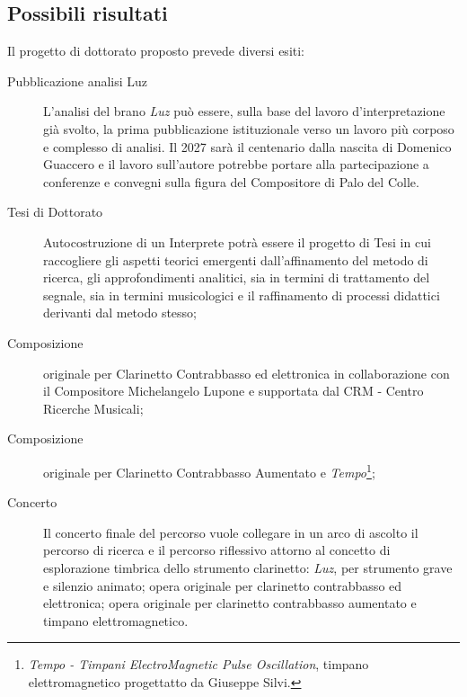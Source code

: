 \documentclass{gs-adonis}
\begin{document}
\subsection{Possibili risultati}%


Il progetto di dottorato proposto prevede diversi esiti:

\begin{description}
  \item[Pubblicazione analisi Luz] L'analisi del brano \emph{Luz} può essere,
    sulla base del lavoro d'interpretazione già svolto, la prima pubblicazione
    istituzionale verso un lavoro più corposo e complesso di analisi. Il 2027
    sarà il centenario dalla nascita di Domenico Guaccero e il lavoro
    sull'autore potrebbe portare alla partecipazione a conferenze e convegni
    sulla figura del Compositore di Palo del Colle.
  \item[Tesi di Dottorato] Autocostruzione di un Interprete potrà essere il
    progetto di Tesi in cui raccogliere gli aspetti teorici emergenti
    dall'affinamento del metodo di ricerca, gli approfondimenti analitici, sia
    in termini di trattamento del segnale, sia in termini musicologici e il
    raffinamento di processi didattici derivanti dal metodo stesso;
  \item[Composizione] originale per Clarinetto Contrabbasso ed elettronica in
    collaborazione con il Compositore Michelangelo Lupone e supportata dal
    CRM - Centro Ricerche Musicali;
  \item[Composizione] originale per Clarinetto Contrabbasso Aumentato e
    \emph{Tempo}\footnote{%
  \emph{Tempo - Timpani ElectroMagnetic Pulse Oscillation}, timpano
  elettromagnetico progettatto da Giuseppe Silvi.
  };
  \item[Concerto] Il concerto finale del percorso vuole collegare in un arco di
    ascolto il percorso di ricerca e il percorso riflessivo attorno al concetto di
    esplorazione timbrica dello strumento clarinetto: \emph{Luz}, per strumento
    grave e silenzio animato; opera originale per clarinetto contrabbasso ed
    elettronica; opera originale per clarinetto contrabbasso aumentato e timpano
    elettromagnetico.
\end{description}
\end{document}
